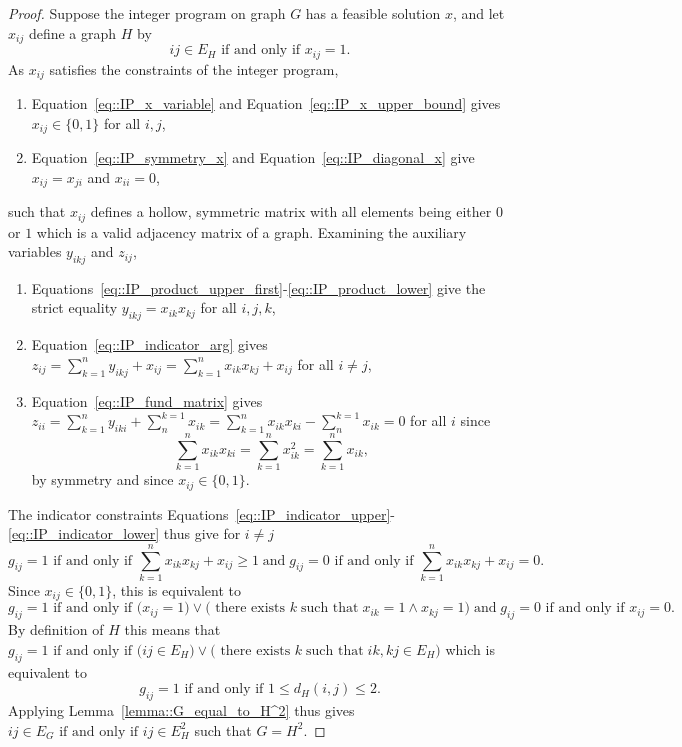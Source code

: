 \begin{proof}
  Suppose the integer program on graph $G$ has a feasible solution $x$, and let $x_{ij}$ define a graph $H$ by 
  \[
  ij \in E_H \text{ if and only if } x_{ij} = 1. 
  \]
  As $x_{ij}$ satisfies the constraints of the integer program, 
  \begin{enumerate}[label=\roman*)]
    \item Equation~\eqref{eq::IP_x_variable} and Equation~\eqref{eq::IP_x_upper_bound} gives $x_{ij} \in \{0 , 1\}$ for all $i,j$,
    \item Equation~\eqref{eq::IP_symmetry_x} and Equation~\eqref{eq::IP_diagonal_x} give $x_{ij} = x_{ji}$ and $x_{ii} = 0$,
  \end{enumerate}
  such that $x_{ij}$ defines a hollow, symmetric matrix with all elements being either $0$ or $1$ which is a valid adjacency matrix of a graph. 
  Examining the auxiliary variables $y_{ikj}$ and $z_{ij}$, 
  \begin{enumerate}[label=\roman*)]
    \item Equations~\eqref{eq::IP_product_upper_first}-\eqref{eq::IP_product_lower} give the strict equality $y_{ikj} = x_{ik}x_{kj}$ for all $i,j,k$,
    \item Equation~\eqref{eq::IP_indicator_arg} gives $\displaystyle z_{ij} = \sum_{k = 1}^{n}y_{ikj} + x_{ij} = \sum_{k = 1}^{n}x_{ik}x_{kj} + x_{ij}$ for all $i \neq j$,
    \item Equation~\eqref{eq::IP_fund_matrix} gives $\displaystyle z_{ii} = \sum_{k = 1}^{n}y_{iki} + \sum_{n}^{k = 1}x_{ik} = \sum_{k = 1}^{n} x_{ik}x_{ki} - \sum_{n}^{k = 1}x_{ik} = 0$ for all $i$ since
    \[
    \sum_{k = 1}^{n} x_{ik}x_{ki} = \sum_{k = 1}^{n} x_{ik}^2 = \sum_{k = 1}^{n} x_{ik},
    \]
    by symmetry and since $x_{ij} \in \{0 , 1\}$. 
  \end{enumerate} 
  The indicator constraints Equations~\eqref{eq::IP_indicator_upper}-\eqref{eq::IP_indicator_lower} thus give for $i \neq j$
  \[
  g_{ij} = 1 \text{ if and only if } \sum_{k=1}^{n} x_{ik}x_{kj} + x_{ij} \geq 1 \; \text{and} \; g_{ij} = 0 \text{ if and only if } \sum_{k=1}^{n} x_{ik}x_{kj} + x_{ij} = 0. 
  \]
  Since $x_{ij} \in \{0,1\}$, this is equivalent to 
  \[
  g_{ij} = 1 \text{ if and only if } \Big(x_{ij} = 1 \Big) \lor \Big(\text{ there exists } k \;\text{such that}\; x_{ik}= 1 \land x_{kj}=1\Big) \; \text{and} \; g_{ij} = 0 \text{ if and only if } x_{ij} = 0. 
  \]
  By definition of $H$ this means that $g_{ij} = 1 \text{ if and only if } \Big( ij \in E_H \Big) \lor \Big( \text{ there exists } k \;\text{such that}\; ik,kj \in E_H\Big)$ which is equivalent to 
  \[
  g_{ij} = 1 \text{ if and only if } 1 \leq d_H(i,j) \leq 2. 
  \]
  Applying Lemma~\ref{lemma::G_equal_to_H^2} thus gives $ij \in E_G \text{ if and only if } ij \in E_H^2$ such that $G=H^2$. 
\end{proof}
